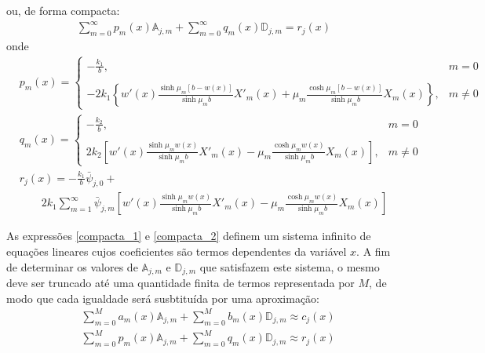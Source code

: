 ou, de forma compacta:
\begin{align}
\sum_{m = 0}^\infty p_m(x) \mathbb{A}_{j,m} + \sum_{m = 0}^\infty q_m(x) \mathbb{D}_{j,m} = r_{j}(x) \label{compacta_2}
\end{align}
onde
\begin{align}
& p_m(x) = \left\lbrace
\begin{array}{ll}
\displaystyle -\frac{k_1}{b}, & m = 0 \\ \\
\displaystyle -2k_1\left\lbrace w'(x)\frac{\sinh\mu_m [b - w(x)]}{\sinh\mu_m b}X'_m(x) +   \mu_m\frac{\cosh\mu_m [b - w(x)]}{\sinh\mu_m b}X_m(x)\right\rbrace, & m \ne 0
\end{array}
\right. \label{compacta_p} \\
& q_m(x) = \left\lbrace
\begin{array}{ll}
\displaystyle -\frac{k_2}{b}, & m = 0 \\ \\
\displaystyle 2k_2\left[ w'(x) \frac{\sinh\mu_m w(x)}{\sinh\mu_m b}  X'_m(x) - \mu_m\frac{\cosh\mu_m w(x)}{\sinh\mu_m b} X_m(x) \right], & m \ne 0
\end{array}
\right. \label{compacta_q} \\
&
r_{j}(x) = -\frac{k_1}{b}\bar{\psi}_{j,0} + \nonumber \\
& \quad\quad  2k_1 \sum_{m=1}^\infty \bar{\psi}_{j, m}\left[ w'(x)\frac{\sinh\mu_m w(x)}{\sinh\mu_m b}X'_m(x) -  \mu_m\frac{\cosh\mu_m w(x)}{\sinh\mu_m b}X_m(x)\right] \label{compacta_r}
\end{align}

As expressões \eqref{compacta_1} e \eqref{compacta_2} definem um sistema infinito de equações lineares cujos coeficientes são termos
dependentes da variável $x$. A fim de determinar os valores de $\mathbb{A}_{j,m}$ e $\mathbb{D}_{j,m}$ que satisfazem este sistema, o mesmo
deve ser truncado até uma quantidade finita de termos representada por $M$, de modo que cada igualdade será susbtituída por uma aproximação:
\begin{align}
& \sum_{m = 0}^M a_m(x) \mathbb{A}_{j,m} + \sum_{m = 0}^M b_m(x) \mathbb{D}_{j,m} \approx c_{j}(x) \label{compacta_aprox_1} \\
& \sum_{m = 0}^M p_m(x) \mathbb{A}_{j,m} + \sum_{m = 0}^M q_m(x) \mathbb{D}_{j,m} \approx r_{j}(x) \label{compacta_aprox_2}
\end{align}

